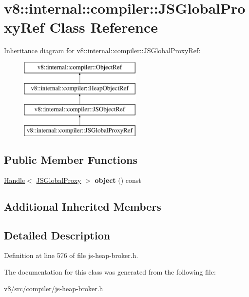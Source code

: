 \hypertarget{classv8_1_1internal_1_1compiler_1_1JSGlobalProxyRef}{}\section{v8\+:\+:internal\+:\+:compiler\+:\+:J\+S\+Global\+Proxy\+Ref Class Reference}
\label{classv8_1_1internal_1_1compiler_1_1JSGlobalProxyRef}
Inheritance diagram for v8\+:\+:internal\+:\+:compiler\+:\+:J\+S\+Global\+Proxy\+Ref\+:\begin{figure}[H]
\begin{center}
\leavevmode
\includegraphics[height=4.000000cm]{classv8_1_1internal_1_1compiler_1_1JSGlobalProxyRef}
\end{center}
\end{figure}
\subsection*{Public Member Functions}
\begin{DoxyCompactItemize}
\item 
\mbox{\label{classv8_1_1internal_1_1compiler_1_1JSGlobalProxyRef_a5156ff4a703c0229980e7b7b9d45dc7a}} 
\mbox{\hyperlink{classv8_1_1internal_1_1Handle}{Handle}}$<$ \mbox{\hyperlink{classv8_1_1internal_1_1JSGlobalProxy}{J\+S\+Global\+Proxy}} $>$ {\bfseries object} () const
\end{DoxyCompactItemize}
\subsection*{Additional Inherited Members}


\subsection{Detailed Description}


Definition at line 576 of file js-\/heap-\/broker.\+h.



The documentation for this class was generated from the following file\+:\begin{DoxyCompactItemize}
\item 
v8/src/compiler/js-\/heap-\/broker.\+h\end{DoxyCompactItemize}
